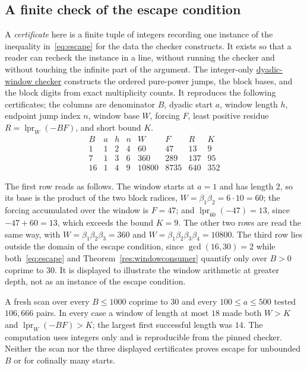 \documentclass[11pt]{article}
\begin{document}
\subsection{A finite check of the escape condition}

A \emph{certificate} here is a finite tuple of integers recording one instance
of the inequality in~\eqref{eq:escape} for the data the checker constructs.  It
exists so that a reader can recheck the instance in a line, without running the
checker and without touching the infinite part of the argument.  The
integer-only
\href{\sourceurl/scripts/check_erdos269_dyadic_windows.py}{dyadic-window
checker} constructs the ordered pure-power jumps, the block bases, and the
block digits from exact multiplicity counts.  It reproduces the following
certificates; the columns are denominator $B$, dyadic start $a$, window length
$h$, endpoint jump index $n$, window base $W$, forcing $F$, least positive
residue $R=\operatorname{lpr}_{W}(-BF)$, and short bound $K$.
\[
\begin{array}{c|c|c|c|r|r|r|r}
B&a&h&n&W&F&R&K\\ \hline
1&1&2&4&60&47&13&9\\
7&1&3&6&360&289&137&95\\
16&1&4&9&10800&8735&640&352
\end{array}
\]

The first row reads as follows.  The window starts at $a=1$ and has length $2$,
so its base is the product of the two block radices,
$W=\beta_1\beta_2=6\cdot10=60$; the forcing accumulated over the window is
$F=47$; and $\operatorname{lpr}_{60}(-47)=13$, since $-47+60=13$, which exceeds
the bound $K=9$.  The other two rows are read the same way, with
$W=\beta_1\beta_2\beta_3=360$ and $W=\beta_1\beta_2\beta_3\beta_4=10800$.
The third row lies outside the domain of the escape condition, since
$\gcd(16,30)=2$ while both~\eqref{eq:escape} and
Theorem~\ref{res:windowconsumer} quantify only over $B>0$ coprime to $30$.  It
is displayed to illustrate the window arithmetic at greater depth, not as an
instance of the escape condition.

A fresh scan over every $B\le1000$ coprime to $30$ and every
$100\le a\le500$ tested $106{,}666$ pairs.  In every case a window of length
at most $18$ made both $W>K$ and
$\operatorname{lpr}_{W}(-BF)>K$; the largest first successful length was
$14$.  The computation uses integers only and is reproducible from the pinned
checker.  Neither the scan nor the three displayed certificates proves escape
for unbounded $B$ or for cofinally many starts.
\end{document}
